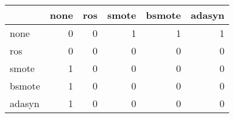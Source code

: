 \begin{tabular}{lrrrrr}
\hline
        &   none &   ros &   smote &   bsmote &   adasyn \\
\hline
 none   &      0 &     0 &       1 &        1 &        1 \\
 ros    &      0 &     0 &       0 &        0 &        0 \\
 smote  &      1 &     0 &       0 &        0 &        0 \\
 bsmote &      1 &     0 &       0 &        0 &        0 \\
 adasyn &      1 &     0 &       0 &        0 &        0 \\
\hline
\end{tabular}